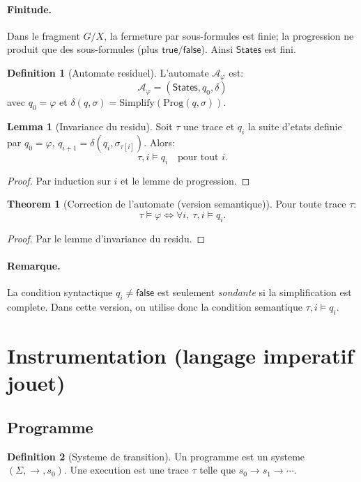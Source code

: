 \documentclass[11pt]{article}
\newcommand{\eval}{\models}
\newcommand{\Prog}{\mathrm{Prog}}
\newcommand{\states}{\mathsf{States}}
\newcommand{\deltaa}{\delta}
\newcommand{\True}{\mathsf{true}}
\newcommand{\False}{\mathsf{false}}
\theoremstyle{definition}
\newtheorem{definition}{Definition}
\newtheorem{lemma}{Lemma}
\newtheorem{theorem}{Theorem}
\begin{document}
\paragraph{Finitude.}
Dans le fragment $G/X$, la fermeture par sous-formules est finie; la progression
ne produit que des sous-formules (plus $\True/\False$). Ainsi $\states$ est fini.

\begin{definition}[Automate residuel]
L'automate $\mathcal{A}_\varphi$ est:
\[
\mathcal{A}_\varphi = (\states, q_0, \deltaa)
\]
avec $q_0=\varphi$ et
$\deltaa(q,\sigma)=\mathrm{Simplify}(\Prog(q,\sigma))$.
\end{definition}

\begin{lemma}[Invariance du residu]
Soit $\tau$ une trace et $q_i$ la suite d'etats definie par
$q_0=\varphi$, $q_{i+1}=\deltaa(q_i,\sigma_{\tau[i]})$. Alors:
\[
\tau,i \eval q_i \quad \text{pour tout } i.
\]
\end{lemma}
\begin{proof}
Par induction sur $i$ et le lemme de progression.
\end{proof}

\begin{theorem}[Correction de l'automate (version semantique)]
Pour toute trace $\tau$:
\[
\tau \eval \varphi \iff \forall i,\ \tau,i \eval q_i.
\]
\end{theorem}
\begin{proof}
Par le lemme d'invariance du residu.
\end{proof}

\paragraph{Remarque.}
La condition syntactique $q_i \ne \False$ est seulement \emph{sondante} si la
simplification est complete. Dans cette version, on utilise donc la condition
semantique $\tau,i \eval q_i$.

\section{Instrumentation (langage imperatif jouet)}

\subsection{Programme}

\begin{definition}[Systeme de transition]
Un programme est un systeme $(\Sigma,\rightarrow,s_0)$.
Une execution est une trace $\tau$ telle que $s_0 \rightarrow s_1 \rightarrow \cdots$.
\end{definition}
\end{document}
